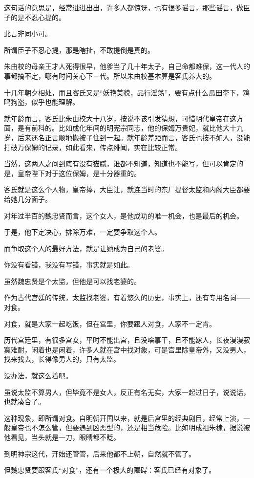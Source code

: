 \begin{multicols}{\theparacolNo}
这句话的意思是，经常进进出出，许多人都惊讶，也有很多谣言，那些谣言，做臣子的是不忍心提的。

此言非同小可。

所谓臣子不忍心提，那是瞎扯，不敢提倒是真的。

朱由校的母亲王才人死得很早，他爹当了几十年太子，自己命都难保，这一代人的事都搞不定，哪有时间关心下一代。所以朱由校基本算是客氏养大的。

十几年朝夕相处，而且客氏又是“妖艳美貌，品行淫荡”，要有点什么瓜田李下，鸡鸣狗盗，似乎也能理解。

就年龄而言，客氏比朱由校大十八岁，按说不该引发猜想，可惜明代皇帝在这方面，是有前科的。比如成化年间的明宪宗同志，他的保姆万贵妃，就比他大十九岁，后来还名正言顺地搬被子住到一起。就年龄差距而言，客氏也技不如人，没能打破万保姆的记录，如此看来，传点绯闻，实在比较正常。

当然，这两人之间到底有没有猫腻，谁都不知道，知道也不能写，但可以肯定的是，皇帝陛下对于这位保姆，是十分器重的。

客氏就是这么个人物，皇帝捧，大臣让，就连当时的东厂提督太监和内阁大臣都要给她几分面子。

对年过半百的魏忠贤而言，这个女人，是他成功的唯一机会，也是最后的机会。

于是，他下定决心，排除万难，一定要争取这个人。

而争取这个人的最好方法，就是让她成为自己的老婆。

你没有看错，我没有写错，事实就是如此。

虽然魏忠贤是个太监，但他是可以找老婆的。

作为古代宫廷的传统，太监找老婆，有着悠久的历史，事实上，还有专用名词——对食。

对食，就是大家一起吃饭，但在宫里，你要跟人对食，人家不一定肯。

历代宫廷里，有很多宫女，平时不能出宫，且没啥事干，且不能嫁人，长夜漫漫寂寞难耐，闲着也是闲着，许多人就在宫中找对象，可是宫里除皇帝外，又没男人，找来找去，长得像男人的，只有太监。

没办法，就这么着吧。

虽说太监不算男人，但毕竟不是女人，反正有名无实，大家一起过日子，说说话，也就凑合了。

这种现象，即所谓对食。自明朝开国以来，就是后宫里的经典剧目，经常上演，一般皇帝也不怎么管，但要遇到凶恶型的，还是相当危险。比如明成祖朱棣，据说被他看见，当头就是一刀，眼睛都不眨。

到明神宗这代，开始还管管，后来他都不上朝，自然就不管了。

但魏忠贤要跟客氏“对食”，还有一个极大的障碍：客氏已经有对象了。


\end{multicols}
